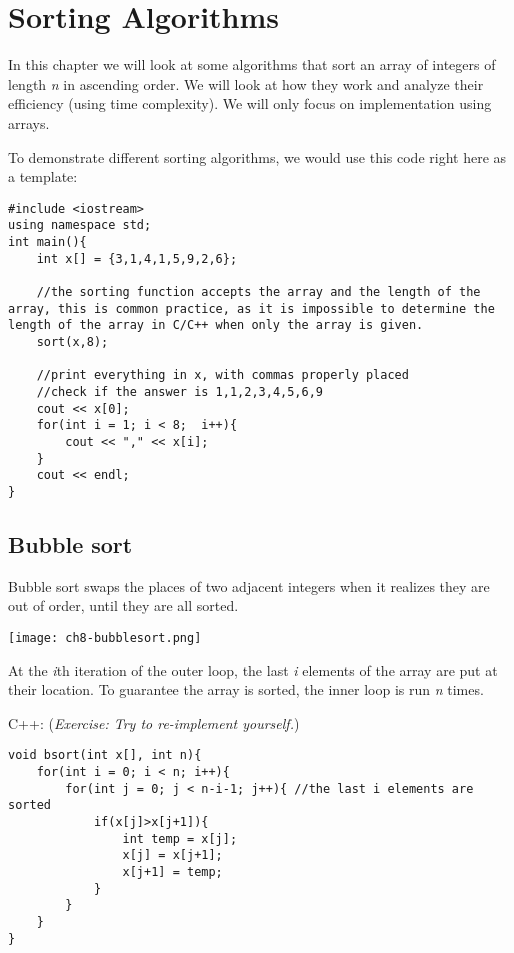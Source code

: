 \chapter{Sorting Algorithms}

In this chapter we will look at some algorithms that sort an array of integers of length \textit{n} in ascending order. We will look at how they work and analyze their efficiency (using time complexity). We will only focus on implementation using arrays.

To demonstrate different sorting algorithms, we would use this code right here as a template:

\begin{lstlisting}
#include <iostream>
using namespace std;
int main(){
    int x[] = {3,1,4,1,5,9,2,6};
    
    //the sorting function accepts the array and the length of the array, this is common practice, as it is impossible to determine the length of the array in C/C++ when only the array is given.
    sort(x,8);

    //print everything in x, with commas properly placed
    //check if the answer is 1,1,2,3,4,5,6,9
    cout << x[0];
    for(int i = 1; i < 8;  i++){
        cout << "," << x[i];
    }
    cout << endl;
}
\end{lstlisting}
\pagebreak
\section{Bubble sort}

Bubble sort swaps the places of two adjacent integers when it realizes they are out of order, until they are all sorted.

\texttt{[image: ch8-bubblesort.png]}

\pagebreak


\pagebreak

At the \textit{i}th iteration of the outer loop, the last \textit{i} elements of the array are put at their location. To guarantee the array is sorted, the inner loop is run \textit{n} times.
\vspace{6mm}

C++: (\textit{Exercise: Try to re-implement yourself.})
\begin{lstlisting}
void bsort(int x[], int n){
    for(int i = 0; i < n; i++){
        for(int j = 0; j < n-i-1; j++){ //the last i elements are sorted
            if(x[j]>x[j+1]){
                int temp = x[j];
                x[j] = x[j+1];
                x[j+1] = temp;
            }
        } 
    }
}
\end{lstlisting}

